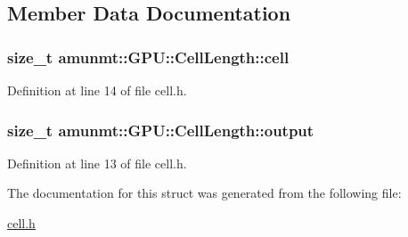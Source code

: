\subsection{Member Data Documentation}
\subsubsection[{\texorpdfstring{cell}{cell}}]{\setlength{\rightskip}{0pt plus 5cm}size\+\_\+t amunmt\+::\+G\+P\+U\+::\+Cell\+Length\+::cell}\hypertarget{structamunmt_1_1GPU_1_1CellLength_a6920571ba5a7ffb26c7e361b19ce2e7c}{}\label{structamunmt_1_1GPU_1_1CellLength_a6920571ba5a7ffb26c7e361b19ce2e7c}


Definition at line 14 of file cell.\+h.

\subsubsection[{\texorpdfstring{output}{output}}]{\setlength{\rightskip}{0pt plus 5cm}size\+\_\+t amunmt\+::\+G\+P\+U\+::\+Cell\+Length\+::output}\hypertarget{structamunmt_1_1GPU_1_1CellLength_af6478b361445f8c7d5b2d45ebc8fd5a6}{}\label{structamunmt_1_1GPU_1_1CellLength_af6478b361445f8c7d5b2d45ebc8fd5a6}


Definition at line 13 of file cell.\+h.



The documentation for this struct was generated from the following file\+:\begin{DoxyCompactItemize}
\item 
\hyperlink{cell_8h}{cell.\+h}\end{DoxyCompactItemize}
